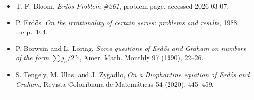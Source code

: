 \begin{itemize}
\item [EP261] T. F. Bloom, \emph{Erd\H{o}s Problem \#261}, problem page, accessed 2026-03-07.
\item [Er88c] P. Erd\H{o}s, \emph{On the irrationality of certain series: problems and results}, 1988; see p.~104.
\item [BoLo90] P. Borwein and L. Loring, \emph{Some questions of Erd\H{o}s and Graham on numbers of the form $\sum g_n/2^{g_n}$}, Amer. Math. Monthly 97 (1990), 22--26.
\item [TUZ20] S. Tengely, M. Ulas, and J. Zygad\l{}o, \emph{On a Diophantine equation of Erd\H{o}s and Graham}, Revista Colombiana de Matem\'aticas 54 (2020), 445--459.
\end{itemize}

\bigskip
\hrule
\bigskip

